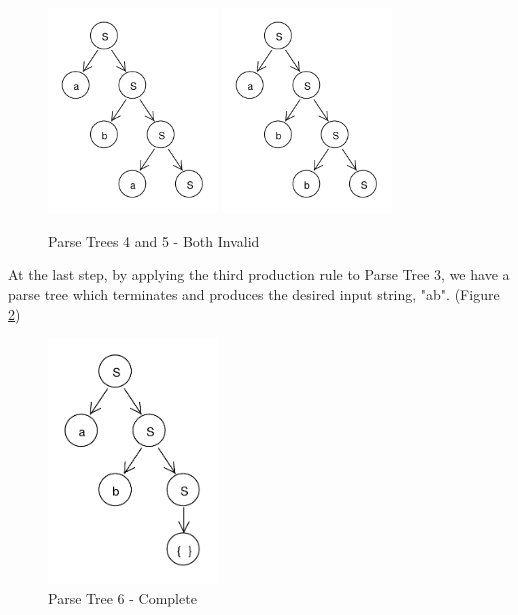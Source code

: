 \documentclass[11pt]{article}
\begin{document}
\begin{figure}[h!]
    \centering
    \includegraphics[width=0.4\textwidth,natwidth=30,natheight=30]{rdp_4.pdf}
    \includegraphics[width=0.4\textwidth,natwidth=30,natheight=30]{rdp_5.pdf}
    \caption{Parse Trees 4 and 5 - Both Invalid}
    \label{fig:rdp_4_5}
\end{figure}

At the last step, by applying the third production rule to Parse Tree 3, we have a parse tree which terminates and produces the
desired input string, "ab". (Figure \ref{fig:rdp_6})

\begin{figure}[h!]
    \centering
    \includegraphics[width=0.4\textwidth,natwidth=30,natheight=30]{rdp_6.pdf}
    \caption{Parse Tree 6 - Complete}
    \label{fig:rdp_6}
\end{figure}
\end{document}
